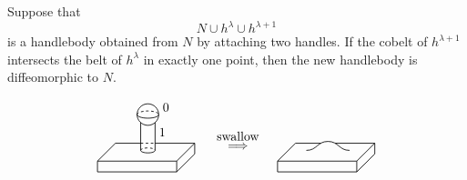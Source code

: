 \begin{theorem}[Cancellation]
    Suppose that 
    \[ N \cup h^\lambda \cup h^{\lambda+1} \]
    is a handlebody obtained from $N$ by attaching two handles.
    If the cobelt of $h^{\lambda+1}$ intersects the belt of $h^\lambda$
    in exactly one point,
    then the new handlebody is diffeomorphic to $N$.
\end{theorem}

\[ \begin{tikzpicture}[line width=.6]
    \tikzstyle{dp}=[dash pattern=on 2pt off 2pt]
    
    \draw (-.2,.2) -- (-.9,.2) -- (-1.4,-.3) -- (-1.4,-.6) -- (.8,-.6) -- (1.3,-.1) -- (1.3,.2) -- (.2,.2)
          (-1.4,-.3) -- (.8,-.3) -- (1.3,.2)
          (.8,-.3) -- (.8,-.6);
    \draw[dp] (-.2,.2) -- (.2,.2);

    \draw[dp] (-.2,0) arc (180 : 0 : .2 and .07);
    \draw (-.2,0) arc (180 : 360 : .2 and .07);
    \draw (-.2,0) -- (-.2,.78) (.2,0) -- (.2,.78);

    \draw (0,1) circle (.3);
    \draw[dp] (-.3,1) arc (180 : 0 : .3 and .1);
    \draw (-.3,1) arc (180 : 360 : .3 and .1);

    \node at (.5,1.2) {0};
    \node at (.4,.5) {1};

    \node at (2.5,.1) {\text{$\Longrightarrow$}};
    \node at (2.5,.4) {\text{swallow}};
    
    \draw (4.8,.2) -- (4.1,.2) -- (3.6,-.3) -- (3.6,-.6) -- (5.8,-.6) -- (6.3,-.1) -- (6.3,.2) -- (5.2,.2)
          (3.6,-.3) -- (5.8,-.3) -- (6.3,.2)
          (5.8,-.3) -- (5.8,-.6);
    \draw (4.4,0) .. controls (4.7,0) and (4.7,.25) .. (5,.25)
                  .. controls (5.3,.25) and (5.3,0) .. (5.6,0);
\end{tikzpicture} \]
